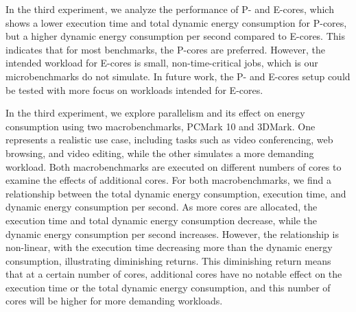 In the third experiment, we analyze the performance of P- and E-cores, which shows a lower execution time and total dynamic energy consumption for P-cores, but a higher dynamic energy consumption per second compared to E-cores. This indicates that for most benchmarks, the P-cores are preferred. However, the intended workload for E-cores is small, non-time-critical jobs, which is our microbenchmarks do not simulate. In future work, the P- and E-cores setup could be tested with more focus on workloads intended for E-cores.

In the third experiment, we explore parallelism and its effect on energy consumption using two macrobenchmarks, PCMark 10 and 3DMark. One represents a realistic use case, including tasks such as video conferencing, web browsing, and video editing, while the other simulates a more demanding workload. Both macrobenchmarks are executed on different numbers of cores to examine the effects of additional cores. For both macrobenchmarks, we find a relationship between the total dynamic energy consumption, execution time, and dynamic energy consumption per second. As more cores are allocated, the execution time and total dynamic energy consumption decrease, while the dynamic energy consumption per second increases. However, the relationship is non-linear, with the execution time decreasing more than the dynamic energy consumption, illustrating diminishing returns. This diminishing return means that at a certain number of cores, additional cores have no notable effect on the execution time or the total dynamic energy consumption, and this number of cores will be higher for more demanding workloads.


